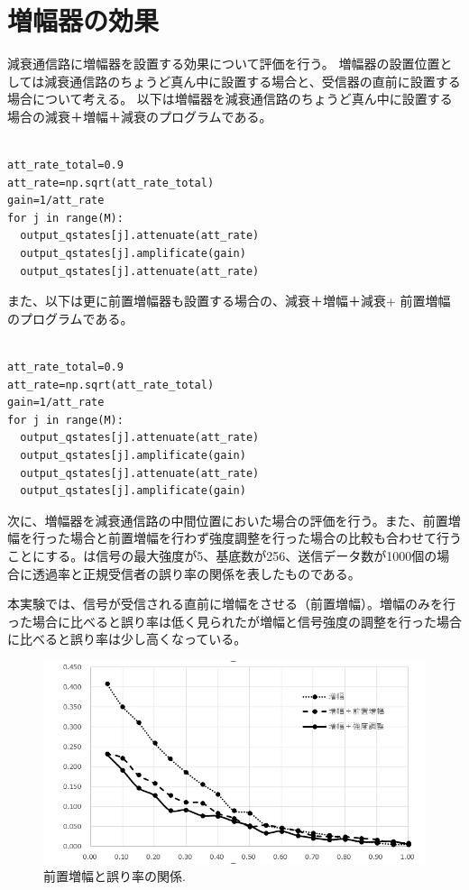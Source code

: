 \chapter{増幅器の効果}
減衰通信路に増幅器を設置する効果について評価を行う。
増幅器の設置位置としては減衰通信路のちょうど真ん中に設置する場合と、受信器の直前に設置する場合について考える。
以下は増幅器を減衰通信路のちょうど真ん中に設置する場合の減衰＋増幅＋減衰のプログラムである。
\begin{lstlisting}[caption=減衰＋増幅＋減衰のプログラム,label=program6]

att_rate_total=0.9
att_rate=np.sqrt(att_rate_total)
gain=1/att_rate
for j in range(M):
  output_qstates[j].attenuate(att_rate)
  output_qstates[j].amplificate(gain)
  output_qstates[j].attenuate(att_rate)

\end{lstlisting}

また、以下は更に前置増幅器も設置する場合の、減衰＋増幅＋減衰+
前置増幅のプログラムである。

\begin{lstlisting}[caption=減衰＋増幅＋減衰＋前置増幅のプログラム,label=program7]

att_rate_total=0.9
att_rate=np.sqrt(att_rate_total)
gain=1/att_rate
for j in range(M):
  output_qstates[j].attenuate(att_rate)
  output_qstates[j].amplificate(gain)
  output_qstates[j].attenuate(att_rate)
  output_qstates[j].amplificate(gain)

\end{lstlisting}


次に、増幅器を減衰通信路の中間位置においた場合の評価を行う。また、前置増幅を行った場合と前置増幅を行わず強度調整を行った場合の比較も合わせて行うことにする。は信号の最大強度が5、基底数が256、送信データ数が1000個の場合に透過率と正規受信者の誤り率の関係を表したものである。

本実験では、信号が受信される直前に増幅をさせる（前置増幅）。増幅のみを行った場合に比べると誤り率は低く見られたが増幅と信号強度の調整を行った場合に比べると誤り率は少し高くなっている。

\begin{figure}[htbp]
        \centering   
        \includegraphics[width=1\textwidth]{img/zemi1-2.png}
        \caption[sample image (png)]{前置増幅と誤り率の関係.}
        \label{Fig:5_5}
    \end{figure}
